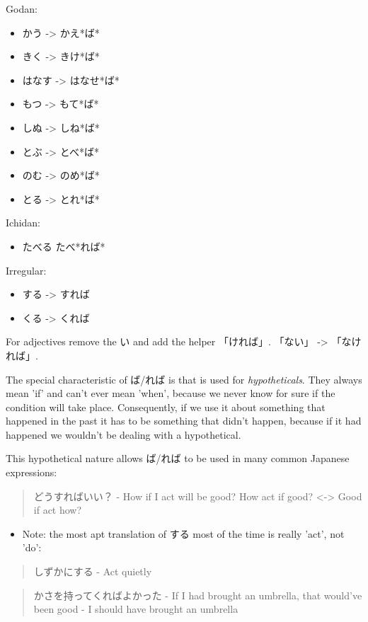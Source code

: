 \documentclass[11pt]{article}
\begin{document}
Godan:
\begin{itemize}
\item かう -> かえ*ば*
\item きく -> きけ*ば*
\item はなす -> はなせ*ば*
\item もつ ->  もて*ば*
\item しぬ ->  しね*ば*
\item とぶ ->  とべ*ば*
\item のむ ->  のめ*ば*
\item とる ->  とれ*ば*
\end{itemize}
Ichidan:
\begin{itemize}
\item たべる たべ*れば*
\end{itemize}
Irregular:
\begin{itemize}
\item する -> すれば
\item くる -> くれば
\end{itemize}

For adjectives remove the い and add the helper 「ければ」. 「ない」 -> 「なければ」.

The special characteristic of ば/れば is that is used for \emph{hypotheticals}. They always mean 'if' and can't ever mean 'when', because we never know for sure if the condition will take place. Consequently, if we use it about something that happened in the past it has to be something that didn't happen, because if it had happened we wouldn't be dealing with a hypothetical.

This hypothetical nature allows ば/れば to be used in many common Japanese expressions:
\begin{quote}
どうすればいい？ - How if I act will be good? How act if good? <-> Good if act how?
\end{quote}
\begin{itemize}
\item Note: the most apt translation of する most of the time is really 'act', not 'do':
\end{itemize}
\begin{quote}
しずかにする - Act quietly
\end{quote}

\begin{quote}
かさを持ってくればよかった - If I had brought an umbrella, that would've been good - I should have brought an umbrella
\end{quote}
\end{document}

